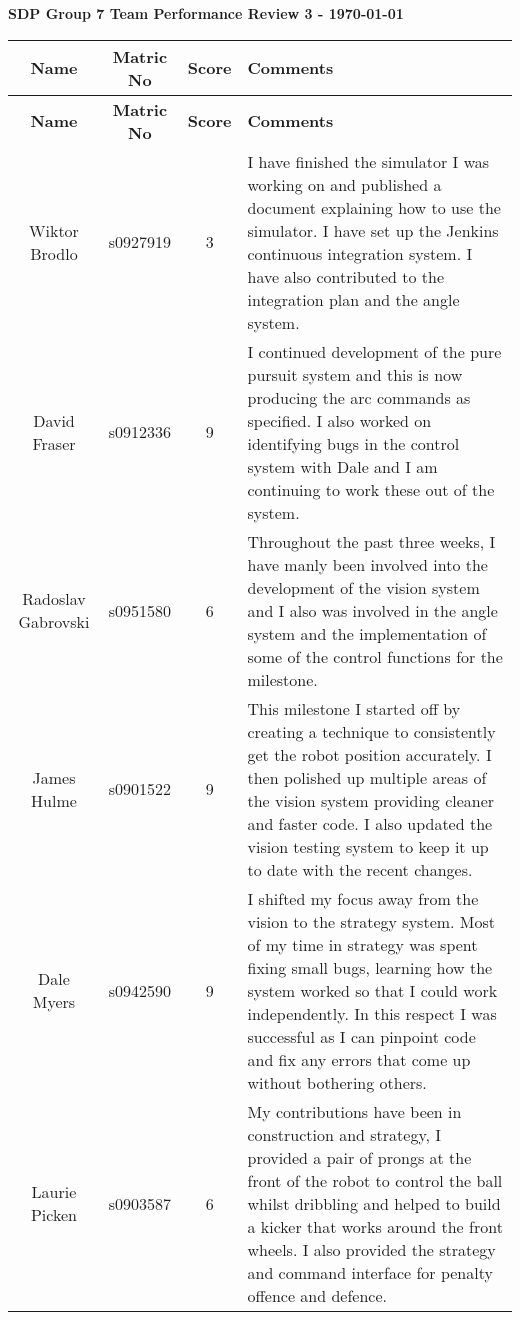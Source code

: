 \documentclass[10pt, a4paper]{article} %
\begin{document}
\textbf{SDP Group 7 Team Performance Review 3 - \today}


\begin{longtable}{c c c p{16cm}}
    \textbf{Name} &
    \textbf{Matric No} &
    \textbf{Score} &
    \textbf{Comments}\\
    \hline
    \endfirsthead


    \textbf{Name} &
    \textbf{Matric No} &
    \textbf{Score} &
    \textbf{Comments}\\
    \hline
    \endhead

    Wiktor Brodlo &
    s0927919 &
    3&
    I have finished the simulator I was working on and published a document
    explaining how to use the simulator. I have set up the Jenkins continuous
    integration system. I have also contributed to the integration plan and the
    angle system.\\


    David Fraser &
    s0912336 &
    9&
    I continued development of the pure pursuit system and this is now
    producing the arc commands as specified. I also worked on identifying bugs
    in the control system with Dale and I am continuing to work these out of
    the system.\\

    Radoslav Gabrovski &
    s0951580 &
    6& 
    Throughout the past three weeks, I have manly been involved into the
    development of the vision system and I also was involved in the angle
    system and the implementation of some of the control functions for the
    milestone. \\


    James Hulme &
    s0901522 &
    9& 
    This milestone I started off by creating a technique to consistently get
    the robot position accurately. I then polished up multiple areas of the
    vision system providing cleaner and faster code. I also updated the vision
    testing system to keep it up to date with the recent changes.\\

    Dale Myers &
    s0942590 &
    9&
    I shifted my focus away from the vision to the strategy system. Most
    of my time in strategy was spent fixing small bugs, learning how the
    system worked so that I could work independently.  In this respect 
    I was successful as I can pinpoint code and fix
    any errors that come up without bothering others.\\

    Laurie Picken &
    s0903587 &
    6&
    My contributions have been in construction and strategy, I provided a pair
    of prongs at the front of the robot to control the ball whilst dribbling
    and helped to build a kicker that works around the front wheels.  I also
    provided the strategy and command interface for penalty offence and
    defence.\\



\end{longtable}
\end{document}

